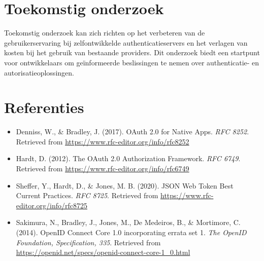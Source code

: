 \documentclass[a0,portrait]{hogent-poster}
\begin{document}
\begin{multicols}{2}
\section{Toekomstig onderzoek}

Toekomstig onderzoek kan zich richten op het verbeteren van de gebruikerservaring bij zelfontwikkelde authenticatieservers en het verlagen van kosten
bij het gebruik van bestaande providers. Dit onderzoek biedt een startpunt voor ontwikkelaars om geïnformeerde beslissingen te nemen over authenticatie-
en autorisatieoplossingen.

\section{Referenties}
\begin{itemize}
    \item Denniss, W., \& Bradley, J. (2017). OAuth 2.0 for Native Apps. \textit{RFC 8252}. Retrieved from \url{https://www.rfc-editor.org/info/rfc8252}
    \item Hardt, D. (2012). The OAuth 2.0 Authorization Framework. \textit{RFC 6749}. Retrieved from \url{https://www.rfc-editor.org/info/rfc6749}
    \item Sheffer, Y., Hardt, D., \& Jones, M. B. (2020). JSON Web Token Best Current Practices. \textit{RFC 8725}. Retrieved from \url{https://www.rfc-editor.org/info/rfc8725}
    \item Sakimura, N., Bradley, J., Jones, M., De Medeiros, B., \& Mortimore, C. (2014). OpenID Connect Core 1.0 incorporating errata set 1. \textit{The OpenID Foundation, Specification, 335}. Retrieved from \url{https://openid.net/specs/openid-connect-core-1_0.html}
\end{itemize}

\end{multicols}
\end{document}
